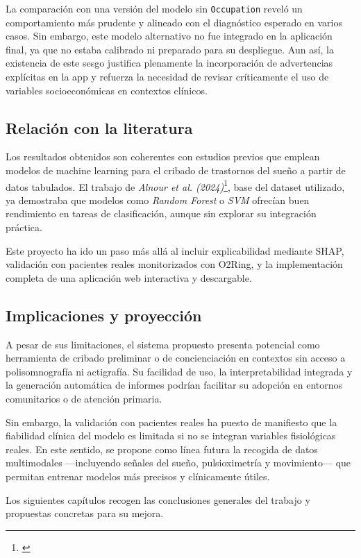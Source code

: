 La comparación con una versión del modelo sin \texttt{Occupation} reveló un comportamiento más prudente y alineado con el diagnóstico esperado en varios casos. Sin embargo, este modelo alternativo no fue integrado en la aplicación final, ya que no estaba calibrado ni preparado para su despliegue. Aun así, la existencia de este sesgo justifica plenamente la incorporación de advertencias explícitas en la app y refuerza la necesidad de revisar críticamente el uso de variables socioeconómicas en contextos clínicos.


\subsection{Relación con la literatura}

Los resultados obtenidos son coherentes con estudios previos que emplean modelos de machine learning para el cribado de trastornos del sueño a partir de datos tabulados. El trabajo de \textit{Alnour et al. (2024)}\footnote{\cite{alnour2024kaggle}}, base del dataset utilizado, ya demostraba que modelos como \textit{Random Forest} o \textit{SVM} ofrecían buen rendimiento en tareas de clasificación, aunque sin explorar su integración práctica.

Este proyecto ha ido un paso más allá al incluir explicabilidad mediante SHAP, validación con pacientes reales monitorizados con O2Ring, y la implementación completa de una aplicación web interactiva y descargable.


\subsection{Implicaciones y proyección}

A pesar de sus limitaciones, el sistema propuesto presenta potencial como herramienta de cribado preliminar o de concienciación en contextos sin acceso a polisomnografía ni actigrafía. Su facilidad de uso, la interpretabilidad integrada y la generación automática de informes podrían facilitar su adopción en entornos comunitarios o de atención primaria.

Sin embargo, la validación con pacientes reales ha puesto de manifiesto que la fiabilidad clínica del modelo es limitada si no se integran variables fisiológicas reales. En este sentido, se propone como línea futura la recogida de datos multimodales —incluyendo señales del sueño, pulsioximetría y movimiento— que permitan entrenar modelos más precisos y clínicamente útiles.

Los siguientes capítulos recogen las conclusiones generales del trabajo y propuestas concretas para su mejora.